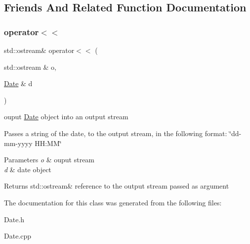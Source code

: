\subsection{Friends And Related Function Documentation}
\mbox{\label{classDate_a2f114c7aa1398dac0f21b888bcb40f3e}} 
\subsubsection{\texorpdfstring{operator$<$$<$}{operator<<}}
{\footnotesize\ttfamily std\+::ostream\& operator$<$$<$ (\begin{DoxyParamCaption}\item[{std\+::ostream \&}]{o,  }\item[{\mbox{\hyperlink{classDate}{Date}} \&}]{d }\end{DoxyParamCaption})\hspace{0.3cm}{\ttfamily [friend]}}



ouput \mbox{\hyperlink{classDate}{Date}} object into an output stream 

Passes a string of the date, to the output stream, in the following format\+: \char`\"{}dd-\/mm-\/yyyy H\+H\+:\+M\+M\char`\"{}


\begin{DoxyParams}{Parameters}
{\em o} & ouput stream \\
\hline
{\em d} & date object \\
\hline
\end{DoxyParams}
\begin{DoxyReturn}{Returns}
std\+::ostream\& reference to the output stream passed as argument 
\end{DoxyReturn}


The documentation for this class was generated from the following files\+:\begin{DoxyCompactItemize}
\item 
Date.\+h\item 
Date.\+cpp\end{DoxyCompactItemize}
